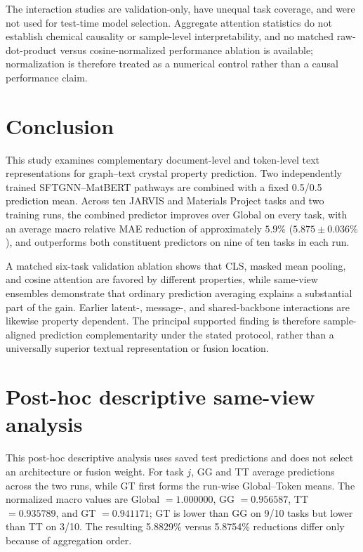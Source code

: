 \documentclass[a4paper,fleqn]{cas-sc}
\begin{document}
The interaction studies are validation-only, have unequal task coverage, and were not used for test-time model selection. Aggregate attention statistics do not establish chemical causality or sample-level interpretability, and no matched raw-dot-product versus cosine-normalized performance ablation is available; normalization is therefore treated as a numerical control rather than a causal performance claim.

\section{Conclusion}
This study examines complementary document-level and token-level text representations for graph--text crystal property prediction. Two independently trained SFTGNN--MatBERT pathways are combined with a fixed 0.5/0.5 prediction mean. Across ten JARVIS and Materials Project tasks and two training runs, the combined predictor improves over Global on every task, with an average macro relative MAE reduction of approximately $5.9\%$ ($5.875\pm0.036\%$), and outperforms both constituent predictors on nine of ten tasks in each run.

A matched six-task validation ablation shows that CLS, masked mean pooling, and cosine attention are favored by different properties, while same-view ensembles demonstrate that ordinary prediction averaging explains a substantial part of the gain. Earlier latent-, message-, and shared-backbone interactions are likewise property dependent. The principal supported finding is therefore sample-aligned prediction complementarity under the stated protocol, rather than a universally superior textual representation or fusion location.

\appendix
\setcounter{topnumber}{5}
\setcounter{bottomnumber}{5}
\setcounter{totalnumber}{10}
\renewcommand{\topfraction}{0.95}
\renewcommand{\bottomfraction}{0.95}
\renewcommand{\textfraction}{0.05}
\renewcommand{\floatpagefraction}{0.10}
\section{Post-hoc descriptive same-view analysis}
This post-hoc descriptive analysis uses saved test predictions and does not select an architecture or fusion weight. For task $j$, GG and TT average predictions across the two runs, while GT first forms the run-wise Global--Token means. The normalized macro values are Global $=1.000000$, GG $=0.956587$, TT $=0.935789$, and GT $=0.941171$; GT is lower than GG on 9/10 tasks but lower than TT on 3/10. The resulting 5.8829\% versus 5.8754\% reductions differ only because of aggregation order.
\end{document}
